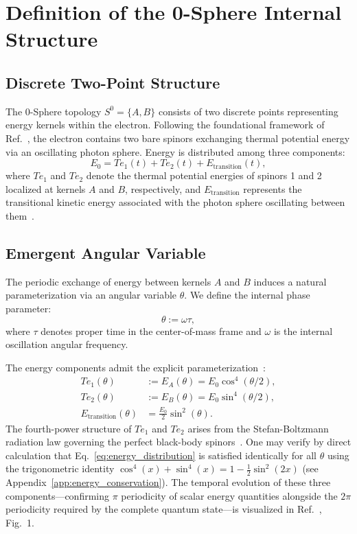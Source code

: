 \documentclass[%
 reprint,
 amsmath,amssymb,
 aps,
 prb,
]{revtex4-2}
\numberwithin{equation}{section}
\theoremstyle{definition}
\theoremstyle{remark}
\newcommand{\Sphere}{S^0}
\begin{document}
\section{Definition of the 0-Sphere Internal Structure}
\label{sec:0sphere}

\subsection{Discrete Two-Point Structure}

The 0-Sphere topology $\Sphere = \{A, B\}$ consists of two discrete points representing energy kernels within the electron. Following the foundational framework of Ref.~\cite{Hanamura_2018_01}, the electron contains two bare spinors exchanging thermal potential energy via an oscillating photon sphere. Energy is distributed among three components:
\begin{equation}
E_0 = Te_1(t) + Te_2(t) + E_{\text{transition}}(t),
\label{eq:energy_distribution}
\end{equation}
where $Te_1$ and $Te_2$ denote the thermal potential energies of spinors 1 and 2 localized at kernels $A$ and $B$, respectively, and $E_{\text{transition}}$ represents the transitional kinetic energy associated with the photon sphere oscillating between them~\cite{Hanamura_2018_01}.



\subsection{Emergent Angular Variable}

The periodic exchange of energy between kernels $A$ and $B$ induces a natural parameterization via an angular variable $\theta$. We define the internal phase parameter:
\begin{equation}
\theta := \omega \tau,
\label{eq:theta_definition}
\end{equation}
where $\tau$ denotes proper time in the center-of-mass frame and $\omega$ is the internal oscillation angular frequency.

The energy components admit the explicit parameterization~\cite{Hanamura_2018_01}:
\begin{align}
Te_1(\theta) &:= E_A(\theta) = E_0 \cos^4(\theta/2), \label{eq:EA} \\
Te_2(\theta) &:= E_B(\theta) = E_0 \sin^4(\theta/2), \label{eq:EB} \\
E_{\text{transition}}(\theta) &= \frac{E_0}{2} \sin^2(\theta). \label{eq:Etrans}
\end{align}
The fourth-power structure of $Te_1$ and $Te_2$ arises from the Stefan-Boltzmann radiation law governing the perfect black-body spinors~\cite{Hanamura_2018_01}. One may verify by direct calculation that Eq.~\eqref{eq:energy_distribution} is satisfied identically for all $\theta$ using the trigonometric identity $\cos^4(x) + \sin^4(x) = 1 - \frac{1}{2}\sin^2(2x)$ (see Appendix~\ref{app:energy_conservation}). The temporal evolution of these three components---confirming $\pi$ periodicity of scalar energy quantities alongside the $2\pi$ periodicity required by the complete quantum state---is visualized in Ref.~\cite{Hanamura_2026_35}, Fig.~1.
\end{document}
